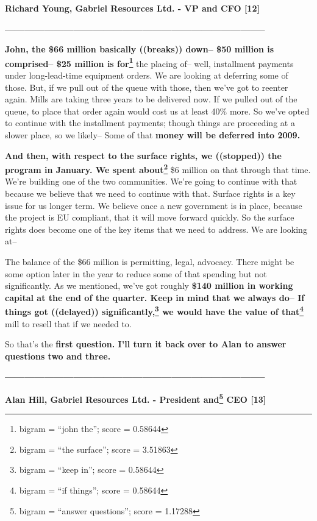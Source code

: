 \documentclass{article}
\begin{document}
 \textbf{Richard Young, Gabriel Resources Ltd. - VP and CFO [12]} 

 \textbf{--------------------------------------------------------------------------------} 

 \textbf{John, the \$66 million basically ((breaks)) down-- \$50 million is comprised-- \$25 million is for\footnote{bigram = ``john the''; score = 0.58644}} the placing of-- well, installment payments under long-lead-time equipment orders. We are looking at deferring some of those. But, if we pull out of the queue with those, then we've got to reenter again. Mills are taking three years to be delivered now. If we pulled out of the queue, to place that order again would cost us at least 40\% more. So we've opted to continue with the installment payments; though things are proceeding at a slower place, so we likely-- Some of that \textbf{money will be deferred into 2009.} 

 \textbf{And then, with respect to the surface rights, we ((stopped)) the program in January. We spent about\footnote{bigram = ``the surface''; score = 3.51863}} \$6 million on that through that time. We're building one of the two communities. We're going to continue with that because we believe that we need to continue with that. Surface rights is a key issue for us longer term. We believe once a new government is in place, because the project is EU compliant, that it will move forward quickly. So the surface rights does become one of the key items that we need to address. We are looking at-- 

 The balance of the \$66 million is permitting, legal, advocacy. There might be some option later in the year to reduce some of that spending but not significantly. As we mentioned, we've got roughly \textbf{\$140 million in working capital at the end of the quarter. Keep in mind that we always do-- If things got ((delayed)) significantly,\footnote{bigram = ``keep in''; score = 0.58644} we would have the value of that\footnote{bigram = ``if things''; score = 0.58644}} mill to resell that if we needed to. 

 So that's the \textbf{first question. I'll turn it back over to Alan to answer questions two and three.} 

 \textbf{--------------------------------------------------------------------------------} 

 \textbf{Alan Hill, Gabriel Resources Ltd. - President and\footnote{bigram = ``answer questions''; score = 1.17288} CEO [13]} 
\end{document}
